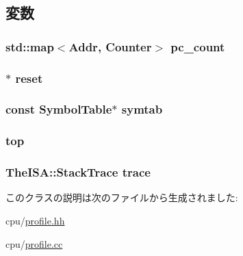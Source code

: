 \subsection{変数}
\hypertarget{classFunctionProfile_a89a94d86887ffe0099680979bb27513b}{
\subsubsection[{pc\_\-count}]{\setlength{\rightskip}{0pt plus 5cm}std::map$<${\bf Addr}, {\bf Counter}$>$ {\bf pc\_\-count}}}
\label{classFunctionProfile_a89a94d86887ffe0099680979bb27513b}
\hypertarget{classFunctionProfile_a0ed28bbd12f6ccb6cb1d367c6078cdb4}{
\subsubsection[{reset}]{$\ast$ {\bf reset}}}
\label{classFunctionProfile_a0ed28bbd12f6ccb6cb1d367c6078cdb4}
\hypertarget{classFunctionProfile_afc2455c41183c75b789c6f4135d13eb5}{
\subsubsection[{symtab}]{\setlength{\rightskip}{0pt plus 5cm}const {\bf SymbolTable}$\ast$ {\bf symtab}}}
\label{classFunctionProfile_afc2455c41183c75b789c6f4135d13eb5}
\hypertarget{classFunctionProfile_a00dff89330b641ca394fe1763d98a156}{
\subsubsection[{top}]{ {\bf top}}}
\label{classFunctionProfile_a00dff89330b641ca394fe1763d98a156}
\hypertarget{classFunctionProfile_a0b590bcf103e321ac16f6b062981fb52}{
\subsubsection[{trace}]{\setlength{\rightskip}{0pt plus 5cm}TheISA::StackTrace {\bf trace}}}
\label{classFunctionProfile_a0b590bcf103e321ac16f6b062981fb52}


このクラスの説明は次のファイルから生成されました:\begin{DoxyCompactItemize}
\item 
cpu/\hyperlink{profile_8hh}{profile.hh}\item 
cpu/\hyperlink{profile_8cc}{profile.cc}\end{DoxyCompactItemize}

